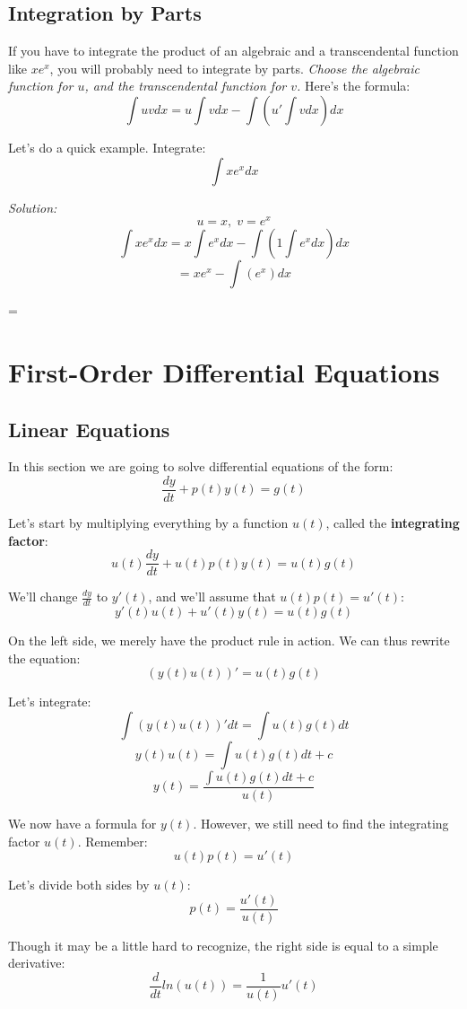 \subsection{Integration by Parts}
If you have to integrate the product of an algebraic and a transcendental function like $xe^{x}$, you will probably need to integrate by parts. \textit{Choose the algebraic function for $u$, and the transcendental function for $v$.} Here's the formula:
$$\int uvdx = u\int vdx - \int \left(u'\int vdx\right)dx$$

Let's do a quick example. Integrate:
$$\int xe^{x}dx$$

\textit{Solution:}
$$u = x,\;v = e^{x}$$
$$\int xe^{x}dx = x\int e^{x}dx - \int \left(1\int e^{x}dx\right)dx$$
$$= xe^{x} - \int (e^{x})dx$$
\begin{center}
	= 
\end{center}

\section{First-Order Differential Equations}
\subsection{Linear Equations}
In this section we are going to solve differential equations of the form: $$\frac{dy}{dt} + p(t)y(t) = g(t)$$

Let's start by multiplying everything by a function $u(t)$, called the \textbf{integrating factor}: $$u(t)\frac{dy}{dt} + u(t)p(t)y(t) = u(t)g(t)$$

We'll change $\frac{dy}{dt}$ to $y'(t)$, and we'll assume that $u(t)p(t)=u'(t)$: $$y'(t)u(t) + u'(t)y(t) = u(t)g(t)$$

On the left side, we merely have the product rule in action. We can thus rewrite the equation: $$(y(t)u(t))' = u(t)g(t)$$

Let's integrate:
$$\int (y(t)u(t))'dt = \int u(t)g(t)dt$$
$$y(t)u(t) = \int u(t)g(t)dt + c$$
$$y(t) = \frac{\int u(t)g(t)dt + c}{u(t)}$$

We now have a formula for $y(t)$. However, we still need to find the integrating factor $u(t)$. Remember: $$u(t)p(t)=u'(t)$$

Let's divide both sides by $u(t)$: $$p(t) = \frac{u'(t)}{u(t)}$$

Though it may be a little hard to recognize, the right side is equal to a simple derivative:
$$\frac{d}{dt}ln(u(t)) = \frac{1}{u(t)}u'(t)$$

